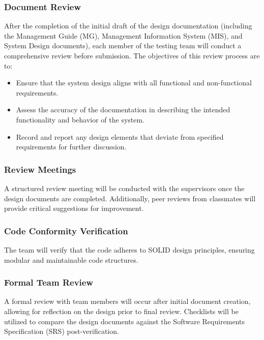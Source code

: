 \documentclass[12pt, titlepage]{article}
\begin{document}
\subsubsection{Document Review}
After the completion of the initial draft of the design documentation (including the Management
Guide (MG), Management Information System (MIS), and System Design documents), each member of
the testing team will conduct a comprehensive review before submission. The objectives of this
review process are to:
\begin{itemize}
  \item Ensure that the system design aligns with all functional and non-functional requirements.
  \item Assess the accuracy of the documentation in describing the intended functionality and
  behavior of the system.
  \item Record and report any design elements that deviate from specified requirements for
  further discussion.
\end{itemize}

\subsubsection{Review Meetings}
A structured review meeting will be conducted with the supervisors once the design documents
are completed. Additionally, peer reviews from classmates will provide critical suggestions for
improvement.

\subsubsection{Code Conformity Verification}
The team will verify that the code adheres to SOLID design principles, ensuring modular and
maintainable code structures.

\subsubsection{Formal Team Review}
A formal review with team members will occur after initial document creation, allowing for
reflection on the design prior to final review. Checklists will be utilized to compare the
design documents against the Software Requirements Specification (SRS) post-verification.
\end{document}
